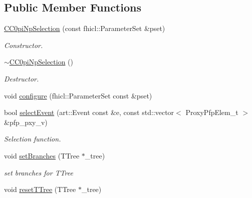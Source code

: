 \subsection*{Public Member Functions}
\begin{DoxyCompactItemize}
\item 
\hyperlink{classselection_1_1CC0piNpSelection_a5770519e6639db45cb9f3a4b1bf3efc2}{C\-C0pi\-Np\-Selection} (const fhicl\-::\-Parameter\-Set \&pset)
\begin{DoxyCompactList}\small\item\em Constructor. \end{DoxyCompactList}\item 
\hypertarget{classselection_1_1CC0piNpSelection_a7f809f358e84885ae2f08f54b4b8183b}{\hyperlink{classselection_1_1CC0piNpSelection_a7f809f358e84885ae2f08f54b4b8183b}{$\sim$\-C\-C0pi\-Np\-Selection} ()}\label{classselection_1_1CC0piNpSelection_a7f809f358e84885ae2f08f54b4b8183b}

\begin{DoxyCompactList}\small\item\em Destructor. \end{DoxyCompactList}\item 
void \hyperlink{classselection_1_1CC0piNpSelection_ace78372ffb6d92911f79ded647aacf4c}{configure} (fhicl\-::\-Parameter\-Set const \&pset)
\item 
bool \hyperlink{classselection_1_1CC0piNpSelection_aee88d296a2ebad59acadfd919139d96f}{select\-Event} (art\-::\-Event const \&e, const std\-::vector$<$ Proxy\-Pfp\-Elem\-\_\-t $>$ \&pfp\-\_\-pxy\-\_\-v)
\begin{DoxyCompactList}\small\item\em Selection function. \end{DoxyCompactList}\item 
\hypertarget{classselection_1_1CC0piNpSelection_a6a14e4d0ff713ed2c75055019d278422}{void \hyperlink{classselection_1_1CC0piNpSelection_a6a14e4d0ff713ed2c75055019d278422}{set\-Branches} (T\-Tree $\ast$\-\_\-tree)}\label{classselection_1_1CC0piNpSelection_a6a14e4d0ff713ed2c75055019d278422}

\begin{DoxyCompactList}\small\item\em set branches for T\-Tree \end{DoxyCompactList}\item 
\hypertarget{classselection_1_1CC0piNpSelection_a3d7a6aa0fbd41f4a77390a160ee64e35}{void \hyperlink{classselection_1_1CC0piNpSelection_a3d7a6aa0fbd41f4a77390a160ee64e35}{reset\-T\-Tree} (T\-Tree $\ast$\-\_\-tree)}\label{classselection_1_1CC0piNpSelection_a3d7a6aa0fbd41f4a77390a160ee64e35}


\end{DoxyCompactItemize}
